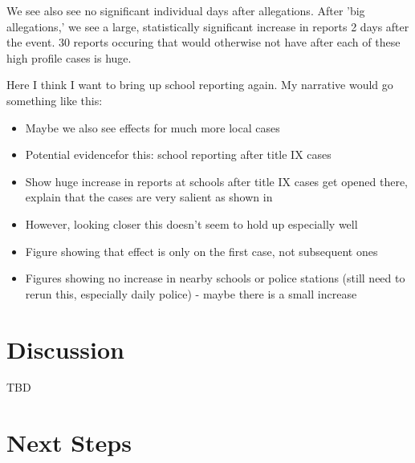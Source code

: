 \documentclass[AER,draftmode]{AEA}
\begin{document}
We see also see no significant individual days after allegations. After 'big allegations,' we see a large, statistically significant increase in reports 2 days after the event. 30 reports occuring that would otherwise not have after each of these high profile cases is huge. 

Here I think I want to bring up school reporting again. My narrative would go something like this:
\begin{itemize}
    \item Maybe we also see effects for much more local cases
    \item Potential evidencefor this: school reporting after title IX cases
    \item Show huge increase in reports at schools after title IX cases get opened there, explain that the cases are very salient as shown in 
    \item However, looking closer this doesn't seem to hold up especially well
    \item Figure showing that effect is only on the first case, not subsequent ones
    \item Figures showing no increase in nearby schools or police stations (still need to rerun this, especially daily police) - maybe there is a small increase
\end{itemize}

\section{Discussion}

TBD

\section{Next Steps}
\end{document}
